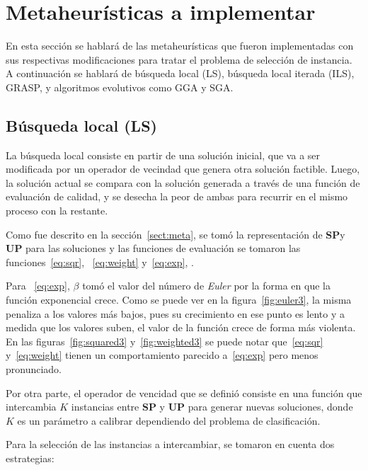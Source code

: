 \documentclass{ci5652}
\begin{document}
\section{Metaheurísticas a implementar}
En esta sección se hablará de las metaheurísticas que fueron implementadas con sus respectivas modificaciones para tratar el problema de selección de instancia. A continuación se hablará de búsqueda local (LS), búsqueda local iterada (ILS), GRASP, y algoritmos evolutivos como GGA y SGA.
\subsection{Búsqueda local (LS)}\label{sect:ls}

La búsqueda local consiste en partir de una solución inicial, que va a ser modificada por un operador de vecindad que genera otra solución factible. Luego, la solución actual se compara con la solución generada a través de una función de evaluación de calidad, y se desecha la peor de ambas para recurrir en el mismo proceso con la restante.

Como fue descrito en la sección~\ref{sect:meta}, se tomó la representación de \textbf{SP}y \textbf{UP} para las soluciones y las funciones de evaluación se tomaron las funciones~\ref{eq:sqr}, ~\ref{eq:weight} y~\ref{eq:exp}, .

Para ~\ref{eq:exp}, $\beta$ tomó el valor del número de \textit{Euler} por la forma en que la función exponencial crece. Como se puede ver en la figura~\ref{fig:euler3}, la misma penaliza a los valores más bajos, pues su crecimiento en ese punto es lento y a medida que los valores suben, el valor de la función crece de forma más violenta. En las figuras~\ref{fig:squared3} y~\ref{fig:weighted3} se puede notar que~\ref{eq:sqr} y~\ref{eq:weight} tienen un comportamiento parecido a~\ref{eq:exp} pero menos pronunciado.

Por otra parte, el operador de vencidad que se definió consiste en una función que intercambia $K$ instancias entre \textbf{SP} y \textbf{UP} para generar nuevas soluciones, donde $K$ es un parámetro a calibrar dependiendo del problema de clasificación.

Para la selección de las instancias a intercambiar, se tomaron en cuenta dos estrategias:
\end{document}

